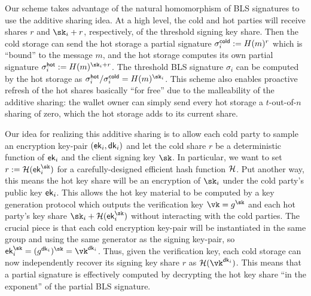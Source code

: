 Our scheme takes advantage of the natural homomorphism of BLS signatures to use the additive sharing idea. At a high level, the cold and hot parties will receive shares $r$ and $\sk_i+r$, respectively, of the threshold signing key share. Then the cold storage can send the hot storage a partial signature $\sigma_i^{\mathsf{cold}} := H(m)^r$ which is ``bound'' to the message $m$, and the hot storage computes its own partial signature $\sigma_i^\hot := \blshash(m)^{\sk_i+r}$. The threshold BLS signature $\sigma_i$ can be computed by the hot storage as $\sigma_i^\hot/\sigma_i^\cold = \blshash(m)^{\sk_i}$. This scheme also enables proactive refresh of the hot shares basically ``for free'' due to the malleability of the additive sharing: the wallet owner can simply send every hot storage a $t$-out-of-$n$ sharing of zero, which the hot storage adds to its current share.

Our idea for realizing this additive sharing is to allow each cold party to sample an encryption key-pair $(\mathsf{ek}_i, \mathsf{dk}_i)$ and let the cold share $r$ be a deterministic function of $\mathsf{ek}_i$ and the client signing key $\sk$. In particular, we want to set $r := \lhlhash(\ek_i^{\sk})$ for a carefully-designed efficient hash function $\mathcal{H}$.
Put another way, this means the hot key share will be an encryption of $\sk_i$ under the cold party's public key $\mathsf{ek}_i$.
This allows the hot key material to be computed by a key generation protocol which outputs the verification key $\vk = g^{\sk}$ and each hot party's key share $\sk_i + \lhlhash(\ek_i^{\sk})$ without interacting with the cold parties. The crucial piece is that each cold encryption key-pair will be instantiated in the same group and using the same generator as the signing key-pair, so $\ek_i^{\sk} = (g^{\dk_i})^{\sk} = \vk^{\dk_i}$. Thus, given the verification key, each cold storage can now independently recover its signing key share $r$ as $\lhlhash(\vk^{\dk_i})$. This means that a partial signature is effectively computed by decrypting the hot key share ``in the exponent'' of the partial BLS signature.


